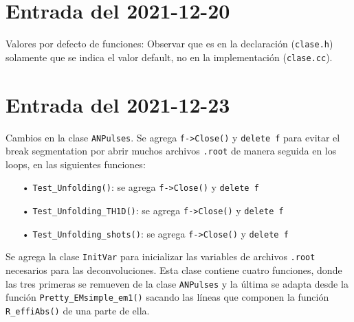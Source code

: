 \documentclass[11pt,letterpaper]{article}
\begin{document}


\section{Entrada del 2021-12-20}
\label{2021-12-20}

\begin{tipt}
Valores por defecto de funciones:  Observar que es en la declaración (\verb|clase.h|) solamente que se indica el valor default, no en la implementación (\verb|clase.cc|).
\end{tipt}

\section{Entrada del 2021-12-23}
\label{2021-12-23}

Cambios en la clase \verb|ANPulses|. Se agrega \verb|f->Close()| y \verb|delete f| para evitar el break segmentation por abrir muchos archivos \verb|.root| de manera seguida en los loops, en las siguientes funciones:

\begin{itemize}
\item[•] \verb|Test_Unfolding()|: se agrega \verb|f->Close()| y \verb|delete f| 
\item[•]  \verb|Test_Unfolding_TH1D()|: se agrega \verb|f->Close()| y \verb|delete f| 
\item[•]  \verb|Test_Unfolding_shots()|: se agrega \verb|f->Close()| y \verb|delete f| 
\end{itemize}

Se agrega la clase \verb|InitVar| para inicializar las variables de archivos \verb|.root| necesarios para las deconvoluciones. Esta clase contiene cuatro funciones, donde las tres primeras se remueven de la clase \verb|ANPulses| y la última se adapta desde la función \verb|Pretty_EMsimple_em1()| sacando las líneas que componen la función \verb| R_effiAbs()| de una parte de ella.
\end{document}

